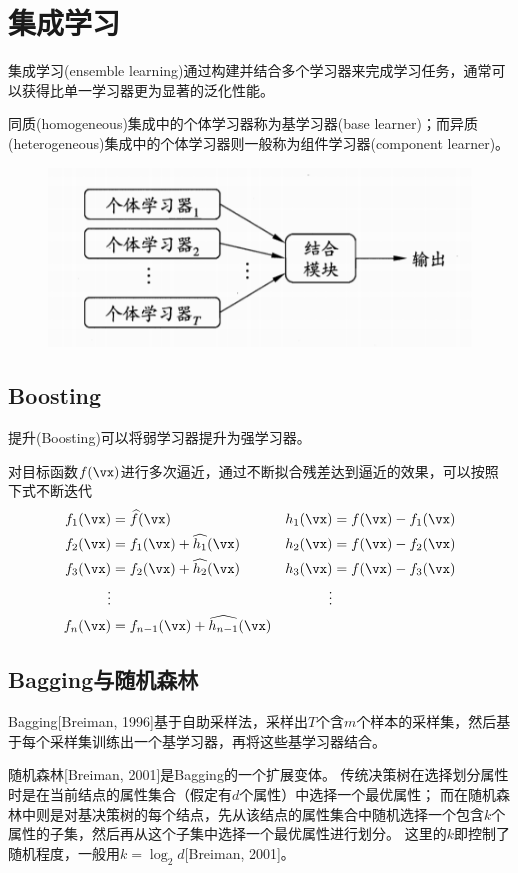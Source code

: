 
\section{集成学习}
集成学习(ensemble learning)通过构建并结合多个学习器来完成学习任务，通常可以获得比单一学习器更为显著的泛化性能。

同质(homogeneous)集成中的个体学习器称为基学习器(base learner)；而异质(heterogeneous)集成中的个体学习器则一般称为组件学习器(component learner)。
\begin{figure}[H]
\centering
\includegraphics[width=0.5\linewidth]{fig/ensemble-learning.png}
\end{figure}

\subsection{Boosting}
提升(Boosting)可以将弱学习器提升为强学习器。

对目标函数$f(\vx)$进行多次逼近，通过不断拟合残差达到逼近的效果，可以按照下式不断迭代
\[\begin{aligned}
f_1(\vx) &=\widehat{f}(\vx)            & h_1(\vx) &=f(\vx)-f_1(\vx)\\
f_2(\vx) &=f_1(\vx)+\widehat{h_1}(\vx) & h_2(\vx) &=f(\vx)-f_2(\vx)\\
f_3(\vx) &=f_2(\vx)+\widehat{h_2}(\vx) & h_3(\vx) &=f(\vx)-f_3(\vx)\\
\vdots   &                             & \vdots \\
f_n(\vx) &=f_{n-1}(\vx)+\widehat{h_{n-1}}(\vx)
\end{aligned}\]

\subsection{Bagging与随机森林}
Bagging[Breiman, 1996]基于自助采样法，采样出$T$个含$m$个样本的采样集，然后基于每个采样集训练出一个基学习器，再将这些基学习器结合。

随机森林[Breiman, 2001]是Bagging的一个扩展变体。
传统决策树在选择划分属性时是在当前结点的属性集合（假定有$d$个属性）中选择一个最优属性；
而在随机森林中则是对基决策树的每个结点，先从该结点的属性集合中随机选择一个包含$k$个属性的子集，然后再从这个子集中选择一个最优属性进行划分。
这里的$k$即控制了随机程度，一般用$k=\log_2 d$[Breiman, 2001]。

